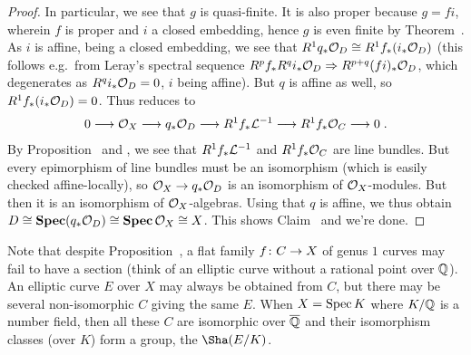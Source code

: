 \documentclass[a4paper,parskip=half,numbers=enddot, DIV=12]{scrreprt}
\begin{document}
\begin{proof}
	In particular, we see that $g$ is quasi-finite. It is also proper because $g=fi$, wherein $f$ is proper and $i$ a closed embedding, hence $g$ is even finite by Theorem~. As $i$ is affine, being a closed embedding, we see that $R^1q_*\mathcal{O}_D\cong R^1f_*(i_*\mathcal{O}_D)$ (this follows e.g.\ from Leray's spectral sequence $R^pf_*R^qi_*\Oo_D\converge R^{p+q}(fi)_*\Oo_D$, which degenerates as $R^qi_*\mathcal{O}_D=0$, $i$ being affine). But $q$ is affine as well, so $R^1f_*(i_*\mathcal{O}_D)=0$. Thus  reduces to 
	\begin{align}
		0\morphism \Oo_X\morphism q_*\Oo_D\morphism R^1f_*\Ll^{-1}\morphism R^1f_*\Oo_C\morphism 0\;.
	\end{align}
	By Proposition~ and , we see that $R^1f_*\mathcal{L}^{-1}$ and $R^1f_*\mathcal{O}_C$ are line bundles. But every epimorphism of line bundles must be an isomorphism (which is easily checked affine-locally), so $\Oo_X\morphism q_*\Oo_D$ is an isomorphism of $\mathcal{O}_X$-modules. But then it is an isomorphism of $\mathcal{O}_X$-algebras. Using that $q$ is affine, we thus obtain $D\cong \operatorname{\mathbf{Spec}} (q_*\mathcal{O}_D)\cong \operatorname{\mathbf{Spec}}\mathcal{O}_X\cong X$. This shows Claim~ and we're done.
\end{proof}
\begin{rem}
	Note that despite Proposition~, a flat family $f\colon C\morphism X$ of genus $1$ curves may fail to have a section (think of an elliptic curve without a rational point over $\mathbb{Q}$). An elliptic curve $E$ over $X$ may always be obtained from $C$, but there may be several non-isomorphic $C$ giving the same $E$. When $X=\operatorname{Spec} K$ where $K/\mathbb{Q}$ is a number field, then all these $C$ are isomorphic over $\overline{\mathbb{Q}}$ and their isomorphism classes (over $K$) form a group, the  $\Sha(E/K)$.
\end{rem}
\end{document}
